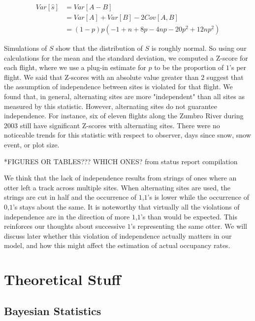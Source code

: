 \documentclass{article}
\begin{document}
    \begin{equation*}
        \begin{split}
        Var[\hat{s}]& =Var[A-B] \\
                    & =Var[A]+Var[B]-2Cov[A,B] \\
                    & =(1-p)p(-1+n+8p-4np-20p^2+12np^2)
        \end{split}
    \end{equation*}

	Simulations of \(S\) show that the distribution of \(S\) is roughly normal.  
So using our calculations for the mean and the standard deviation, we computed
a Z-score for each flight, where we use a plug-in estimate for \(p\) to be the 
proportion of \(1\)'s per flight.  We said that Z-scores with an absolute value 
greater than \(2\) suggest that the assumption of independence between sites is 
violated for that flight.  We found that, in general, alternating sites are more
"independent" than all sites as measured by this statistic.  However, alternating
sites do not guarantee independence.  For instance, six of eleven flights along 
the Zumbro River during 2003 still have significant Z-scores with alternating
sites.  There were no noticeable trends for this statistic with respect to 
observer, days since snow, snow event, or plot size.  

*FIGURES OR TABLES??? WHICH ONES? from status report compilation

	We think that the lack of independence results from strings of ones where an 
otter left a track across multiple sites.  When alternating sites are used, the 
strings are cut in half and the occurrence of \(1\),\(1\)'s is lower while the 
occurrence of \(0\),\(1\)'s stays about the same.  It is noteworthy that 
virtually all the violations of independence are in the direction of more 
\(1\),\(1\)'s than would be expected.  This reinforces our thoughts about 
successive \(1\)'s representing the same otter.  We will discuss later whether 
this violation of independence actually matters in our model, and how this might
affect the estimation of actual occupancy rates.

\section{Theoretical Stuff} 

	\subsection{Bayesian Statistics}
\end{document}
